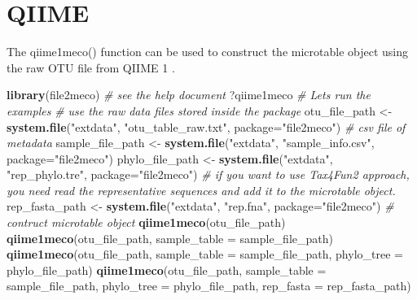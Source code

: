 \documentclass[
]{book}
\newenvironment{Shaded}{\begin{snugshade}}{\end{snugshade}}
\newcommand{\AttributeTok}[1]{\textcolor[rgb]{0.13,0.29,0.53}{#1}}
\newcommand{\CommentTok}[1]{\textcolor[rgb]{0.56,0.35,0.01}{\textit{#1}}}
\newcommand{\FunctionTok}[1]{\textcolor[rgb]{0.13,0.29,0.53}{\textbf{#1}}}
\newcommand{\NormalTok}[1]{#1}
\newcommand{\OtherTok}[1]{\textcolor[rgb]{0.56,0.35,0.01}{#1}}
\newcommand{\StringTok}[1]{\textcolor[rgb]{0.31,0.60,0.02}{#1}}
\begin{document}
\section{QIIME}\label{qiime}

The qiime1meco() function can be used to construct the microtable object using the raw OTU file from QIIME 1 \citep{Caporaso_QIIME_2010}.

\begin{Shaded}
\begin{Highlighting}[]
\FunctionTok{library}\NormalTok{(file2meco)}
\CommentTok{\# see the help document}
\NormalTok{?qiime1meco}
\CommentTok{\# Let\textquotesingle{}s run the examples}
\CommentTok{\# use the raw data files stored inside the package}
\NormalTok{otu\_file\_path }\OtherTok{\textless{}{-}} \FunctionTok{system.file}\NormalTok{(}\StringTok{"extdata"}\NormalTok{, }\StringTok{"otu\_table\_raw.txt"}\NormalTok{, }\AttributeTok{package=}\StringTok{"file2meco"}\NormalTok{)}
\CommentTok{\# csv file of metadata}
\NormalTok{sample\_file\_path }\OtherTok{\textless{}{-}} \FunctionTok{system.file}\NormalTok{(}\StringTok{"extdata"}\NormalTok{, }\StringTok{"sample\_info.csv"}\NormalTok{, }\AttributeTok{package=}\StringTok{"file2meco"}\NormalTok{)}
\NormalTok{phylo\_file\_path }\OtherTok{\textless{}{-}} \FunctionTok{system.file}\NormalTok{(}\StringTok{"extdata"}\NormalTok{, }\StringTok{"rep\_phylo.tre"}\NormalTok{, }\AttributeTok{package=}\StringTok{"file2meco"}\NormalTok{)}
\CommentTok{\# if you want to use Tax4Fun2 approach, you need read the representative sequences and add it to the microtable object.}
\NormalTok{rep\_fasta\_path }\OtherTok{\textless{}{-}} \FunctionTok{system.file}\NormalTok{(}\StringTok{"extdata"}\NormalTok{, }\StringTok{"rep.fna"}\NormalTok{, }\AttributeTok{package=}\StringTok{"file2meco"}\NormalTok{)}
\CommentTok{\# contruct microtable object}
\FunctionTok{qiime1meco}\NormalTok{(otu\_file\_path)}
\FunctionTok{qiime1meco}\NormalTok{(otu\_file\_path, }\AttributeTok{sample\_table =}\NormalTok{ sample\_file\_path)}
\FunctionTok{qiime1meco}\NormalTok{(otu\_file\_path, }\AttributeTok{sample\_table =}\NormalTok{ sample\_file\_path, }\AttributeTok{phylo\_tree =}\NormalTok{ phylo\_file\_path)}
\FunctionTok{qiime1meco}\NormalTok{(otu\_file\_path, }\AttributeTok{sample\_table =}\NormalTok{ sample\_file\_path, }\AttributeTok{phylo\_tree =}\NormalTok{ phylo\_file\_path, }\AttributeTok{rep\_fasta =}\NormalTok{ rep\_fasta\_path)}
\end{Highlighting}
\end{Shaded}
\end{document}

